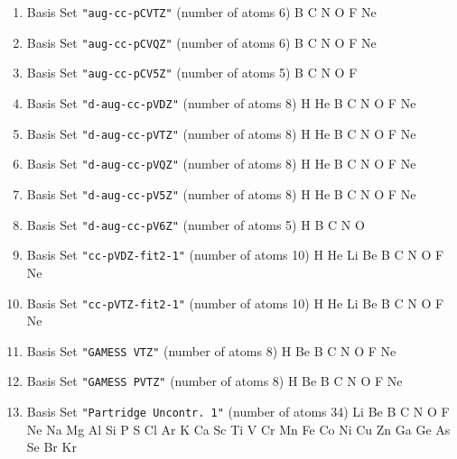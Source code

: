 \begin{enumerate}
\item Basis Set \verb#"aug-cc-pCVTZ"# (number of atoms 6)  \newline 
  B C N O F Ne


\item Basis Set \verb#"aug-cc-pCVQZ"# (number of atoms 6)  \newline 
  B C N O F Ne


\item Basis Set \verb#"aug-cc-pCV5Z"# (number of atoms 5)  \newline 
  B C N O F


\item Basis Set \verb#"d-aug-cc-pVDZ"# (number of atoms 8)  \newline 
  H He B C N O F Ne


\item Basis Set \verb#"d-aug-cc-pVTZ"# (number of atoms 8)  \newline 
  H He B C N O F Ne


\item Basis Set \verb#"d-aug-cc-pVQZ"# (number of atoms 8)  \newline 
  H He B C N O F Ne


\item Basis Set \verb#"d-aug-cc-pV5Z"# (number of atoms 8)  \newline 
  H He B C N O F Ne


\item Basis Set \verb#"d-aug-cc-pV6Z"# (number of atoms 5)  \newline 
  H B C N O


\item Basis Set \verb#"cc-pVDZ-fit2-1"# (number of atoms 10)  \newline 
  H He Li Be B C N O F Ne


\item Basis Set \verb#"cc-pVTZ-fit2-1"# (number of atoms 10)  \newline 
  H He Li Be B C N O F Ne


\item Basis Set \verb#"GAMESS VTZ"# (number of atoms 8)  \newline 
  H Be B C N O F Ne


\item Basis Set \verb#"GAMESS PVTZ"# (number of atoms 8)  \newline 
  H Be B C N O F Ne


\item Basis Set \verb#"Partridge Uncontr. 1"# (number of atoms 34)  \newline 
  Li Be B C N O F Ne Na Mg Al Si P S Cl Ar K Ca Sc Ti V Cr Mn Fe Co
 Ni Cu Zn Ga Ge As Se Br Kr



\end{enumerate}

